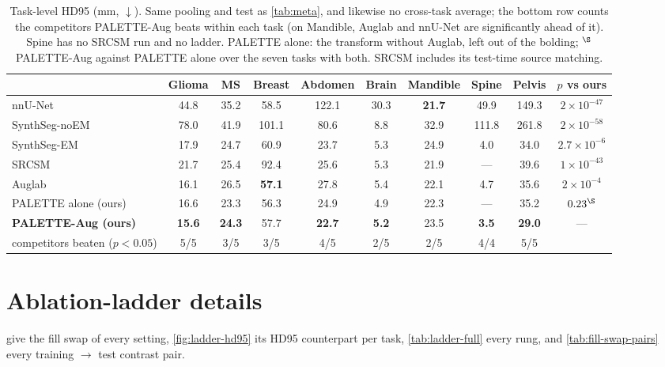 \begin{table}[t]
\centering
\small
\setlength{\tabcolsep}{4pt}
\begin{tabular}{lcccccccc|c}
\toprule
 & Glioma & MS & Breast & Abdomen & Brain & Mandible & Spine & Pelvis & $p$ vs ours \\
\midrule
nnU-Net         & 44.8 & 35.2 & 58.5 & 122.1 & 30.3 & \textbf{21.7} & 49.9 & 149.3 & $2\times10^{-47}$ \\
SynthSeg-noEM   & 78.0 & 41.9 & 101.1 &  80.6 &  8.8 & 32.9 & 111.8 & 261.8 & $2\times10^{-58}$ \\
SynthSeg-EM     & 17.9 & 24.7 & 60.9 &  23.7 &  5.3 & 24.9 & 4.0 & 34.0 & $2.7\times10^{-6}$ \\
SRCSM           & 21.7 & 25.4 & 92.4 & 25.6 &  5.3 & 21.9 & --- & 39.6 & $1\times10^{-43}$ \\
Auglab          & 16.1 & 26.5 & \textbf{57.1} & 27.8 &  5.4 & 22.1 & 4.7 & 35.6 & $2\times10^{-4}$ \\
\midrule
PALETTE alone (ours) & 16.6 & 23.3 & 56.3 & 24.9 & 4.9 & 22.3 & --- & 35.2 & $0.23^\S$ \\
\textbf{PALETTE-Aug (ours)} & \textbf{15.6} & \textbf{24.3} & 57.7 & \textbf{22.7} & \textbf{5.2} & 23.5 & \textbf{3.5} & \textbf{29.0} & --- \\
\midrule
\multicolumn{1}{r}{\footnotesize competitors beaten ($p<0.05$)} &
5/5 & 3/5 & 3/5 & 4/5 & 2/5 & 2/5 & 4/4 & 5/5 & \\
\bottomrule
\end{tabular}
\caption{Task-level HD95 (mm, $\downarrow$). Same pooling and test as
\cref{tab:meta}, and likewise no cross-task average; the bottom row counts the
competitors PALETTE-Aug beats within each task (on Mandible, Auglab and
nnU-Net are significantly ahead of it). Spine has no SRCSM run and no
ladder. PALETTE alone: the transform without Auglab, left out of the bolding;
$^\S$PALETTE-Aug against PALETTE alone over the seven tasks with both.
SRCSM includes its test-time source matching.}
\label{tab:meta-hd95}
\end{table}


\FloatBarrier
\section{Ablation-ladder details}
\label{sec:suppl-ladder}

 give the fill swap of every
setting, \cref{fig:ladder-hd95} its HD95 counterpart per task,
\cref{tab:ladder-full} every rung, and \cref{tab:fill-swap-pairs} every
training $\to$ test contrast pair.

